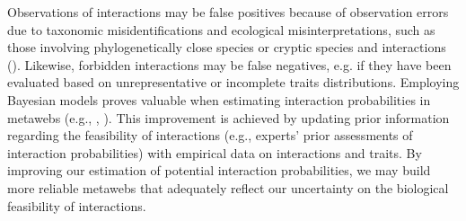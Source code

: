 Observations of interactions may be false positives because of observation
errors due to taxonomic misidentifications and ecological misinterpretations,
such as those involving phylogenetically close species or cryptic species and
interactions (\cite{Pringle2020Resolving}). Likewise, forbidden interactions may
be false negatives, e.g. if they have been evaluated based on unrepresentative
or incomplete traits distributions. Employing Bayesian models proves valuable
when estimating interaction probabilities in metawebs (e.g.,
\cite{Bartomeus2016Common}, \cite{Cirtwill2019Quantitative}). This improvement
is achieved by updating prior information regarding the feasibility of
interactions (e.g., experts' prior assessments of interaction probabilities)
with empirical data on interactions and traits. By improving our estimation of
potential interaction probabilities, we may build more reliable metawebs that
adequately reflect our uncertainty on the biological feasibility of
interactions.



